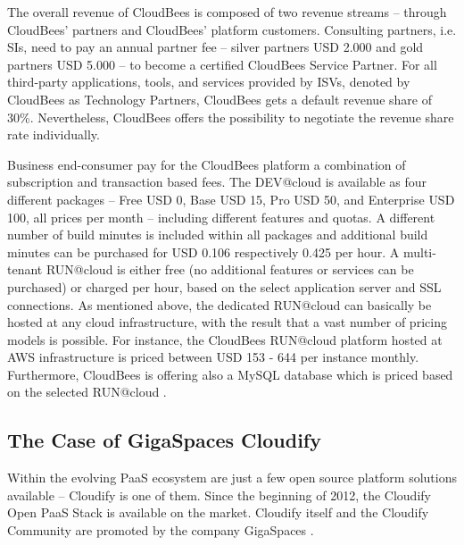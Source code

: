 The overall revenue of CloudBees is composed of two revenue streams -- through CloudBees' partners and CloudBees' platform customers. Consulting partners, i.e. \acp{SI}, need to pay an annual partner fee -- silver partners \ac{USD} 2.000 and gold partners \ac{USD} 5.000 -- to become a certified CloudBees Service Partner. For all third-party applications, tools, and services provided by \acp{ISV}, denoted by CloudBees as Technology Partners, CloudBees gets a default revenue share of 30\%. Nevertheless, CloudBees offers the possibility to negotiate the revenue share rate individually.

Business end-consumer pay for the CloudBees platform a combination of subscription and transaction based fees. The DEV@cloud is available as four different packages -- Free \ac{USD} 0, Base \ac{USD} 15, Pro \ac{USD} 50, and Enterprise \ac{USD} 100, all prices per month -- including different features and quotas. A different number of build minutes is included within all packages and additional build minutes can be purchased for \ac{USD} 0.106 respectively 0.425 per hour. A multi-tenant RUN@cloud is either free (no additional features or services can be purchased) or charged per hour, based on the select application server and SSL connections. As mentioned above, the dedicated RUN@cloud can basically be hosted at any cloud infrastructure, with the result that a vast number of pricing models is possible. For instance, the CloudBees RUN@cloud platform hosted at \ac{AWS} infrastructure is priced between \ac{USD} 153 - 644 per instance monthly. Furthermore, CloudBees is offering also a MySQL database which is priced based on the selected RUN@cloud \citep{CloudBees2013}.




\subsection{The Case of GigaSpaces Cloudify}\label{ch:sota:gsc}

Within the evolving \ac{PaaS} ecosystem are just a few open source platform solutions available -- Cloudify is one of them. Since the beginning of 2012, the Cloudify Open \ac{PaaS} Stack is available on the market. Cloudify itself and the Cloudify Community are promoted by the company GigaSpaces \citep{GigaSpaces2013a}.


